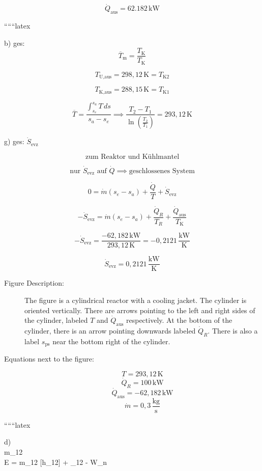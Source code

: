 \[
\dot{Q}_{\text{aus}} = 62.182 \, \text{kW}
\]

``````latex


b) ges:
\[
\overline{T}_{\text{m}} = \frac{T_{\text{K}}}{T_{\text{K}}}
\]

\[
T_{\text{U,aus}} = 298,12 \, \text{K} = T_{\text{K2}}
\]

\[
T_{\text{K,aus}} = 288,15 \, \text{K} = T_{\text{K1}}
\]

\[
\overline{T} = \frac{\int_{s_e}^{s_a} T \, ds}{s_a - s_e} \implies \frac{T_2 - T_1}{\ln \left( \frac{T_2}{T_1} \right)} = 293,12 \, \text{K}
\]

g) ges: $\dot{S}_{\text{evz}}$

\[
\text{zum Reaktor und Kühlmantel}
\]

\[
\text{nur } \dot{S}_{\text{evz}} \text{ auf } \dot{Q} \implies \text{geschlossenes System}
\]

\[
0 = \dot{m} (s_e - s_a) + \frac{\dot{Q}}{T} + \dot{S}_{\text{evz}}
\]

\[
-\dot{S}_{\text{evz}} = \dot{m} (s_e - s_a) + \frac{\dot{Q}_R}{T_R} + \frac{\dot{Q}_{\text{aus}}}{T_{\text{K}}}
\]

\[
-\dot{S}_{\text{evz}} = \frac{-62,182 \, \text{kW}}{293,12 \, \text{K}} = -0,2121 \, \frac{\text{kW}}{\text{K}}
\]

\[
\dot{S}_{\text{evz}} = 0,2121 \, \frac{\text{kW}}{\text{K}}
\]

\begin{description}
\item[Figure Description:] The figure is a cylindrical reactor with a cooling jacket. The cylinder is oriented vertically. There are arrows pointing to the left and right sides of the cylinder, labeled $T$ and $\dot{Q}_{\text{aus}}$ respectively. At the bottom of the cylinder, there is an arrow pointing downwards labeled $\dot{Q}_R$. There is also a label $s_{\text{ps}}$ near the bottom right of the cylinder.

\item[Equations next to the figure:]
\[
T = 293,12 \, \text{K}
\]
\[
\dot{Q}_R = 100 \, \text{kW}
\]
\[
\dot{Q}_{\text{aus}} = -62,182 \, \text{kW}
\]
\[
\dot{m} = 0,3 \, \frac{\text{kg}}{\text{s}}
\]
\end{description}

``````latex

d) \\
 \Delta m_{12} \\

\Delta E = \Delta m_{12} [h_{12}] + \sum {}_{12} - \sum W_n \quad {} \\

